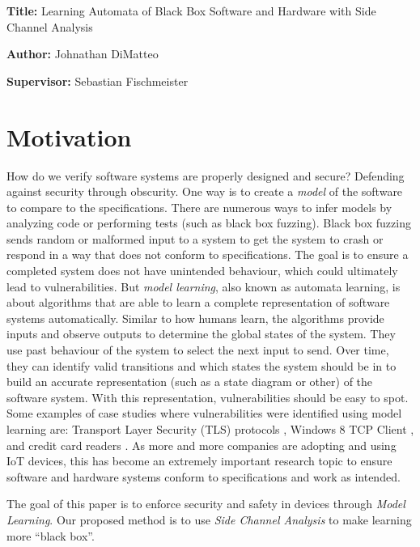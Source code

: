 \documentclass[11pt, a4paper]{article}
\newcommand{\namelistlabel}[1]{\mbox{#1}\hfil}
\newenvironment{namelist}[1]{%
\begin{list}{}
    {
        \let\makelabel\namelistlabel
        \settowidth{\labelwidth}{#1}
        \setlength{\leftmargin}{1.1\labelwidth}
    }
  }{%
\end{list}}
\begin{document}
\begin{namelist}{xxxxxxxxxxxx}
\item[{\bf Title:}]
    Learning Automata of Black Box Software and Hardware with Side Channel Analysis
\item[{\bf Author:}]
	Johnathan DiMatteo
\item[{\bf Supervisor:}]
	Sebastian Fischmeister
\end{namelist}

\section*{Motivation}
How do we verify software systems are properly designed and secure?
Defending against security through obscurity.
One way is to create a \textit{model} of the software to compare to the specifications.
There are numerous ways to infer models by analyzing code or performing tests (such as black box fuzzing).
Black box fuzzing sends random or malformed input to a system to get the system to crash or respond in a way that does not conform to specifications.
The goal is to ensure a completed system does not have unintended behaviour, which could ultimately lead to vulnerabilities.
But \textit{model learning}, also known as automata learning, is about algorithms that are able to learn a complete representation of software systems automatically.
Similar to how humans learn, the algorithms provide inputs and observe outputs to determine the global states of the system.
They use past behaviour of the system to select the next input to send.
Over time, they can identify valid transitions and which states the system should be in to build an accurate representation (such as a state diagram or other) of the software system.
With this representation, vulnerabilities should be easy to spot.
Some examples of case studies where vulnerabilities were identified using model learning are: Transport Layer Security (TLS) protocols \cite{TLS}, Windows 8 TCP Client \cite{fiteruau2016combining}, and credit card readers \cite{chalupar2014automated}. 
As more and more companies are adopting and using IoT devices, this has become an extremely important research topic to ensure software and hardware systems conform to specifications and work as intended.

The goal of this paper is to enforce security and safety in devices through \textit{Model Learning}.
Our proposed method is to use \textit{Side Channel Analysis} to make learning more ``black box''.
\end{document}
